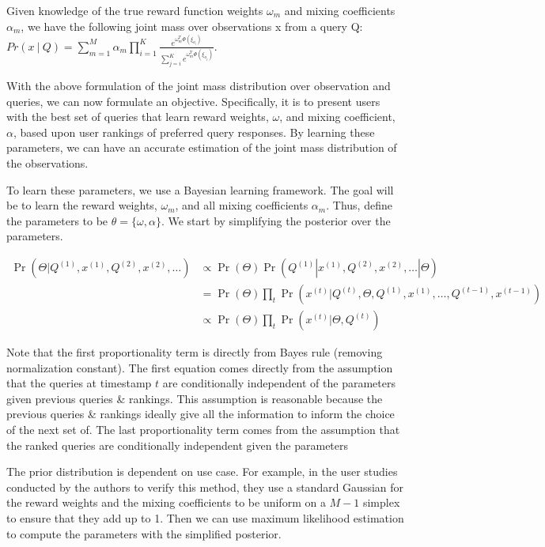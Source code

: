 \documentclass[
  letterpaper,
  DIV=11,
  numbers=noendperiod,
  oneside]{scrreprt}
\theoremstyle{remark}
\begin{document}
Given knowledge of the true reward function weights \(\omega_m\) and
mixing coefficients \(\alpha_m\), we have the following joint mass over
observations x from a query Q:
\(Pr(x\ |\ Q) = \sum_{m = 1}^M \alpha_m\prod_{i = 1}^K\frac{e^{\omega_m^T \Phi(\xi_{a_i})}}{\sum_{j = i}^K e^{\omega_m^T \Phi(\xi_{a_j})}}\).

With the above formulation of the joint mass distribution over
observation and queries, we can now formulate an objective.
Specifically, it is to present users with the best set of queries that
learn reward weights, \(\omega\), and mixing coefficient, \(\alpha\),
based upon user rankings of preferred query responses. By learning these
parameters, we can have an accurate estimation of the joint mass
distribution of the observations.

To learn these parameters, we use a Bayesian learning framework. The
goal will be to learn the reward weights, \(\omega_m\), and all mixing
coefficients \(\alpha_m\). Thus, define the parameters to be
\(\theta = \{\omega, \alpha\}\). We start by simplifying the posterior
over the parameters.

\[\begin{aligned}
\Pr(\Theta | Q^{(1)}, x^{(1)}, Q^{(2)}, x^{(2)}, \ldots) & \propto \Pr(\Theta) \Pr(Q^{(1)} | x^{(1)}, Q^{(2)}, x^{(2)}, \ldots | \Theta) \\
& = \Pr(\Theta) \prod_t \Pr(x^{(t)} | Q^{(t)}, \Theta, Q^{(1)}, x^{(1)}, \ldots, Q^{(t-1)}, x^{(t-1)}) \\
& \propto \Pr(\Theta) \prod_t \Pr(x^{(t)} | \Theta, Q^{(t)})
\end{aligned}\]

Note that the first proportionality term is directly from Bayes rule
(removing normalization constant). The first equation comes directly
from the assumption that the queries at timestamp \(t\) are
conditionally independent of the parameters given previous queries \&
rankings. This assumption is reasonable because the previous queries \&
rankings ideally give all the information to inform the choice of the
next set of. The last proportionality term comes from the assumption
that the ranked queries are conditionally independent given the
parameters

The prior distribution is dependent on use case. For example, in the
user studies conducted by the authors to verify this method, they use a
standard Gaussian for the reward weights and the mixing coefficients to
be uniform on a \(M - 1\) simplex to ensure that they add up to 1. Then
we can use maximum likelihood estimation to compute the parameters with
the simplified posterior.
\end{document}
